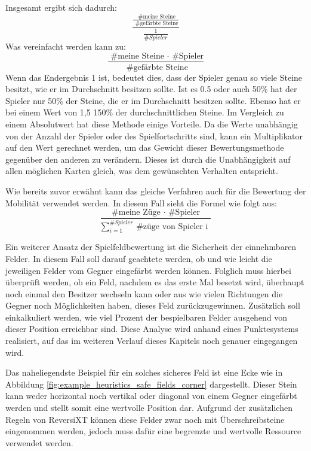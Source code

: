 \documentclass[12pt,a4paper,bibliography=totocnumbered,listof=totocnumbered]{article}
\begin{document}
Insgesamt ergibt sich dadurch:
\[ \frac{ \frac{\text{ \# meine Steine}}{\text{ \# gefärbte Steine}} }{ \frac{1}{ \# Spieler} } \]
Was vereinfacht werden kann zu:
\[ \frac{ \text{ \# meine Steine } \cdot \text{ \# Spieler} }{ \text{ \# gefärbte Steine} } \] 
Wenn das Endergebnis 1 ist, bedeutet dies, dass der Spieler genau so viele Steine besitzt, wie er im Durchschnitt besitzen sollte. Ist es 0.5 oder auch 50\% hat der Spieler nur 50\% der Steine, die er im Durchschnitt besitzen sollte. Ebenso hat er bei einem Wert von 1,5 150\% der durchschnittlichen Steine.
Im Vergleich zu einem Absolutwert hat diese Methode einige Vorteile. Da die Werte unabhängig von der Anzahl der Spieler oder des Spielfortschritts sind, kann ein Multiplikator auf den Wert gerechnet werden, um das Gewicht dieser Bewertungsmethode gegenüber den anderen zu verändern. Dieses ist durch die Unabhängigkeit auf allen möglichen Karten gleich, was dem gewünschten Verhalten entspricht.

Wie bereits zuvor erwähnt kann das gleiche Verfahren auch für die Bewertung der Mobilität verwendet werden. In diesem Fall sieht die Formel wie folgt aus:
\[ \frac{ \text{ \# meine Züge } \cdot \text{ \# Spieler } }{ \sum_{i=1}^{ \#Spieler} \text{ \# züge von Spieler i } }  \]


Ein weiterer Ansatz der Spielfeldbewertung ist die \glqq Sicherheit\grqq{} der einnehmbaren Felder. In diesem Fall soll darauf geachtete werden, ob und wie leicht die jeweiligen Felder vom Gegner eingefärbt werden können. Folglich muss hierbei überprüft werden, ob ein Feld, nachdem es das erste Mal besetzt wird, überhaupt noch einmal den Besitzer wechseln kann oder aus wie vielen Richtungen die Gegner noch Möglichkeiten haben, dieses Feld zurückzugewinnen. Zusätzlich soll einkalkuliert werden, wie viel Prozent der bespielbaren Felder ausgehend von dieser Position erreichbar sind. Diese Analyse wird anhand eines Punktesystems realisiert, auf das im weiteren Verlauf dieses Kapitels noch genauer eingegangen wird.

Das naheliegendste Beispiel für ein solches sicheres Feld ist eine Ecke wie in Abbildung \ref{fig:example_heuristics_safe_fields_corner} dargestellt. Dieser Stein kann weder horizontal noch vertikal oder diagonal von einem Gegner eingefärbt werden und stellt somit eine wertvolle Position dar. Aufgrund der zusätzlichen Regeln von ReversiXT können diese Felder zwar noch mit Überschreibsteine eingenommen werden, jedoch muss dafür eine begrenzte und wertvolle Ressource verwendet werden.
\end{document}
